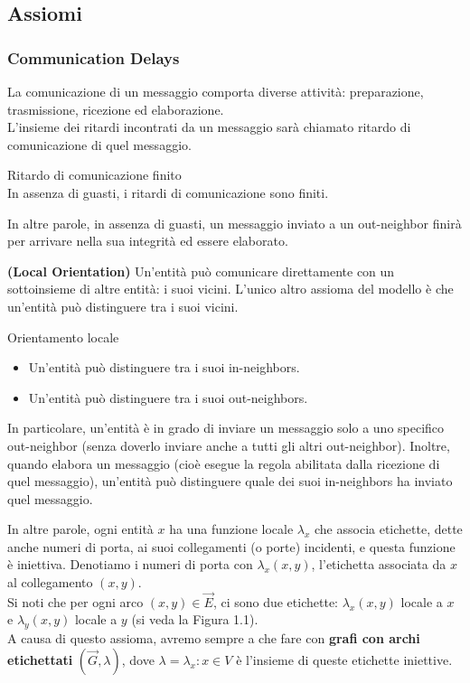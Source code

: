 \subsection{Assiomi}
\subsubsection{Communication Delays}
La comunicazione di un messaggio comporta diverse attività: preparazione,
trasmissione, ricezione ed elaborazione.\\
L'insieme dei ritardi incontrati da un messaggio sarà chiamato ritardo di
comunicazione di quel messaggio.

\begin{axch}
    Ritardo di comunicazione finito\\
    In assenza di guasti, i ritardi di comunicazione sono finiti.

    In altre parole, in assenza di guasti, un messaggio inviato a un out-neighbor
    finirà per arrivare nella sua integrità ed essere elaborato.
\end{axch}

\begin{axch}
    \textbf{(Local Orientation)}
    Un'entità può comunicare direttamente con un sottoinsieme di altre entità: i
    suoi vicini. L'unico altro assioma del modello è che un'entità può distinguere
    tra i suoi vicini.
\end{axch}

\begin{axch}
    Orientamento locale

    \begin{itemize}
        \item Un'entità può distinguere tra i suoi in-neighbors.
        \item Un'entità può distinguere tra i suoi out-neighbors.
    \end{itemize}
\end{axch}

In particolare, un'entità è in grado di inviare un messaggio solo a uno
specifico out-neighbor (senza doverlo inviare anche a tutti gli altri
out-neighbor). Inoltre, quando elabora un messaggio (cioè esegue la regola
abilitata dalla ricezione di quel messaggio), un'entità può distinguere quale
dei suoi in-neighbors ha inviato quel messaggio.

In altre parole, ogni entità $x$ ha una funzione locale $\lambda_x$ che associa
etichette, dette anche numeri di porta, ai suoi collegamenti (o porte)
incidenti, e questa funzione è iniettiva. Denotiamo i numeri di porta con
$\lambda_x (x, y)$, l'etichetta associata da $x$ al collegamento $(x, y)$.\\
Si noti che per ogni arco $(x, y) \in \overrightarrow{E}$, ci sono due
etichette: $\lambda_x (x, y)$ locale a $x$ e $\lambda_y (x, y)$ locale a $y$ (si
veda la Figura 1.1).\\
A causa di questo assioma, avremo sempre a che fare con \textbf{grafi con archi
    etichettati} $(\overrightarrow{G}, \lambda)$, dove $\lambda = {\lambda_x : x \in
    V }$ è l'insieme di queste etichette iniettive.

